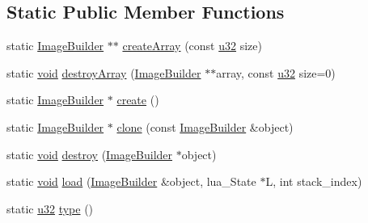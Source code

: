 \subsection*{Static Public Member Functions}
\begin{DoxyCompactItemize}
\item 
static \mbox{\hyperlink{classnjli_1_1_image_builder}{Image\+Builder}} $\ast$$\ast$ \mbox{\hyperlink{classnjli_1_1_image_builder_adfaa3f987876b3411e5ac6b2060d51c0}{create\+Array}} (const \mbox{\hyperlink{_util_8h_a10e94b422ef0c20dcdec20d31a1f5049}{u32}} size)
\item 
static \mbox{\hyperlink{_thread_8h_af1e856da2e658414cb2456cb6f7ebc66}{void}} \mbox{\hyperlink{classnjli_1_1_image_builder_a696d93cef71fa03d40ab656a3ab98954}{destroy\+Array}} (\mbox{\hyperlink{classnjli_1_1_image_builder}{Image\+Builder}} $\ast$$\ast$array, const \mbox{\hyperlink{_util_8h_a10e94b422ef0c20dcdec20d31a1f5049}{u32}} size=0)
\item 
static \mbox{\hyperlink{classnjli_1_1_image_builder}{Image\+Builder}} $\ast$ \mbox{\hyperlink{classnjli_1_1_image_builder_a22ef7a57c5a968e60e1b667d84ff0ca9}{create}} ()
\item 
static \mbox{\hyperlink{classnjli_1_1_image_builder}{Image\+Builder}} $\ast$ \mbox{\hyperlink{classnjli_1_1_image_builder_a201a60e9735869bf1912babb646fb9f3}{clone}} (const \mbox{\hyperlink{classnjli_1_1_image_builder}{Image\+Builder}} \&object)
\item 
static \mbox{\hyperlink{_thread_8h_af1e856da2e658414cb2456cb6f7ebc66}{void}} \mbox{\hyperlink{classnjli_1_1_image_builder_a795fe08161c3424b63bee264dfd3726b}{destroy}} (\mbox{\hyperlink{classnjli_1_1_image_builder}{Image\+Builder}} $\ast$object)
\item 
static \mbox{\hyperlink{_thread_8h_af1e856da2e658414cb2456cb6f7ebc66}{void}} \mbox{\hyperlink{classnjli_1_1_image_builder_a7d423b1145041a8bcb9e6fc66cc5f40a}{load}} (\mbox{\hyperlink{classnjli_1_1_image_builder}{Image\+Builder}} \&object, lua\+\_\+\+State $\ast$L, int stack\+\_\+index)
\item 
static \mbox{\hyperlink{_util_8h_a10e94b422ef0c20dcdec20d31a1f5049}{u32}} \mbox{\hyperlink{classnjli_1_1_image_builder_af77acf29a3dfbb5d35ef115ba97632f3}{type}} ()
\end{DoxyCompactItemize}
